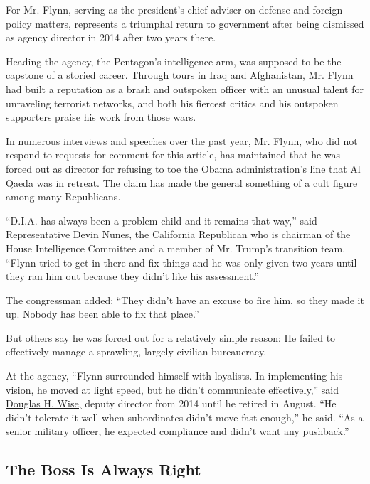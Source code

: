 For Mr. Flynn, serving as the president's chief adviser on defense and
foreign policy matters, represents a triumphal return to government
after being dismissed as agency director in 2014 after two years there.

Heading the agency, the Pentagon's intelligence arm, was supposed to be
the capstone of a storied career. Through tours in Iraq and Afghanistan,
Mr. Flynn had built a reputation as a brash and outspoken officer with
an unusual talent for unraveling terrorist networks, and both his
fiercest critics and his outspoken supporters praise his work from those
wars.

In numerous interviews and speeches over the past year, Mr. Flynn, who
did not respond to requests for comment for this article, has maintained
that he was forced out as director for refusing to toe the Obama
administration's line that Al Qaeda was in retreat. The claim has made
the general something of a cult figure among many Republicans.

``D.I.A. has always been a problem child and it remains that way,'' said
Representative Devin Nunes, the California Republican who is chairman of
the House Intelligence Committee and a member of Mr. Trump's transition
team. ``Flynn tried to get in there and fix things and he was only given
two years until they ran him out because they didn't like his
assessment.''

The congressman added: ``They didn't have an excuse to fire him, so they
made it up. Nobody has been able to fix that place.''

But others say he was forced out for a relatively simple reason: He
failed to effectively manage a sprawling, largely civilian bureaucracy.

At the agency, ``Flynn surrounded himself with loyalists. In
implementing his vision, he moved at light speed, but he didn't
communicate effectively,'' said
\href{http://www.dia.mil/About/Leadership/Article-View/Article/567071/douglas-h-wise/}{Douglas
H. Wise,} deputy director from 2014 until he retired in August. ``He
didn't tolerate it well when subordinates didn't move fast enough,'' he
said. ``As a senior military officer, he expected compliance and didn't
want any pushback.''

\hypertarget{the-boss-is-always-right}{%
\subsection{The Boss Is Always Right}\label{the-boss-is-always-right}}

